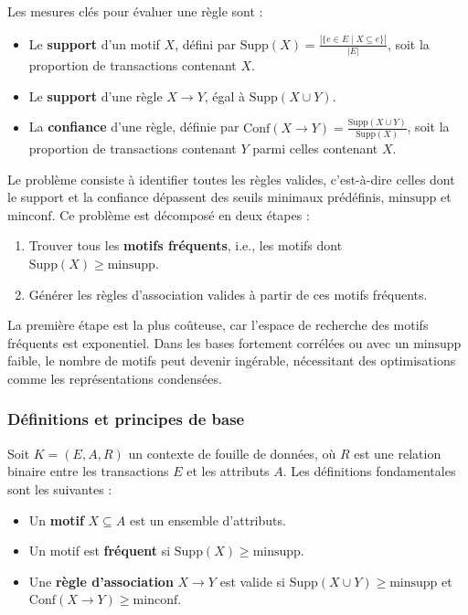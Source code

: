 \documentclass[a4paper,12pt]{report}
\begin{document}
        Les mesures clés pour évaluer une règle sont :
        \begin{itemize}
            \item Le \textbf{support} d’un motif \( X \), défini par \( \text{Supp}(X) = \frac{|\{e \in E \mid X \subseteq e\}|}{|E|} \), soit la proportion de transactions contenant \( X \).
            \item Le \textbf{support} d’une règle \( X \rightarrow Y \), égal à \( \text{Supp}(X \cup Y) \).
            \item La \textbf{confiance} d’une règle, définie par \( \text{Conf}(X \rightarrow Y) = \frac{\text{Supp}(X \cup Y)}{\text{Supp}(X)} \), soit la proportion de transactions contenant \( Y \) parmi celles contenant \( X \).
        \end{itemize}
        
        Le problème consiste à identifier toutes les règles valides, c’est-à-dire celles dont le support et la confiance dépassent des seuils minimaux prédéfinis, \( \text{minsupp} \) et \( \text{minconf} \). Ce problème est décomposé en deux étapes \cite{HGN00} :
        \begin{enumerate}
            \item Trouver tous les \textbf{motifs fréquents}, i.e., les motifs dont \( \text{Supp}(X) \geq \text{minsupp} \).
            \item Générer les règles d’association valides à partir de ces motifs fréquents.
        \end{enumerate}
        
        La première étape est la plus coûteuse, car l’espace de recherche des motifs fréquents est exponentiel. Dans les bases fortement corrélées ou avec un \( \text{minsupp} \) faible, le nombre de motifs peut devenir ingérable, nécessitant des optimisations comme les représentations condensées.
        
        \subsubsection{Définitions et principes de base}
        \label{sec:def_principes}
        
        Soit \( K = (E, A, R) \) un contexte de fouille de données, où \( R \) est une relation binaire entre les transactions \( E \) et les attributs \( A \). Les définitions fondamentales sont les suivantes :
        \begin{itemize}
            \item Un \textbf{motif} \( X \subseteq A \) est un ensemble d’attributs.
            \item Un motif est \textbf{fréquent} si \( \text{Supp}(X) \geq \text{minsupp} \).
            \item Une \textbf{règle d’association} \( X \rightarrow Y \) est valide si \( \text{Supp}(X \cup Y) \geq \text{minsupp} \) et \( \text{Conf}(X \rightarrow Y) \geq \text{minconf} \).
        \end{itemize}
        
\end{document}
